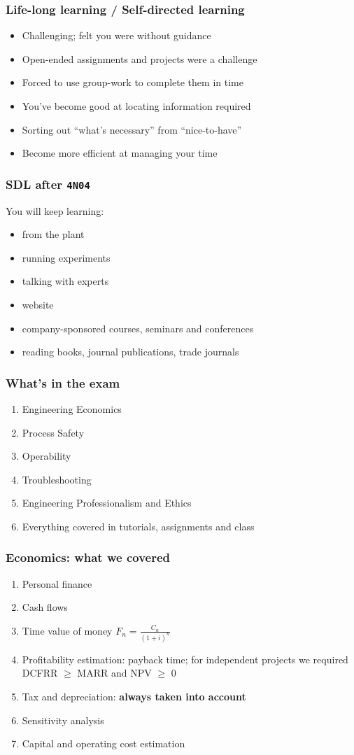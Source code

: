 \begin{frame}\frametitle{Life-long learning / Self-directed learning}
	\begin{itemize}
		\item	Challenging; felt you were without guidance
		\item	Open-ended assignments and projects were a challenge
		\item	Forced to use group-work to complete them in time
		\item	You've become good at locating information required
		\item	Sorting out ``what's necessary'' from ``nice-to-have''
		\item	Become more efficient at managing your time
	\end{itemize}
\end{frame}

\begin{frame}\frametitle{SDL after \texttt{4N04}}
	You will keep learning:
	\begin{itemize}
		\item	from the plant
		\item	running experiments
		\item	talking with experts
		\item	website
		\item	company-sponsored courses, seminars and conferences
		\item	reading books, journal publications, trade journals
	\end{itemize}
\end{frame}

\begin{frame}\frametitle{What's in the exam}
	\begin{enumerate}
		\item	Engineering Economics
		\item	Process Safety
		\item	Operability
		\item	Troubleshooting
		\item	Engineering Professionalism and Ethics
		\item	Everything covered in tutorials, assignments and class
	\end{enumerate}
\end{frame}

\begin{frame}\frametitle{Economics: what we covered}
	\begin{enumerate}
		\item	Personal finance
		\item	Cash flows
		\item	Time value of money $\displaystyle F_n = \frac{C_n}{(1+i)^n}$
		\item	Profitability estimation: payback time; for independent projects we required DCFRR $\geq$ MARR and NPV $\geq$ 0
		\item	Tax and depreciation: \textbf{always taken into account}
		\item	Sensitivity analysis
		\item	Capital and operating cost estimation
	\end{enumerate}
\end{frame}


